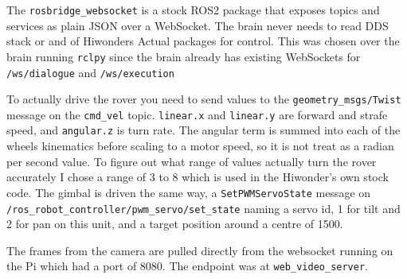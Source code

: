 \label{sec:hw_bridge}


The \texttt{rosbridge\_websocket} is a stock ROS2 package that exposes topics
and services as plain JSON over a WebSocket. The brain never needs to read DDS stack or
and of Hiwonders Actual packages for control. This was chosen over the brain running \texttt{rclpy}
since the brain already has existing WebSockets for \texttt{/ws/dialogue} and \texttt{/ws/execution}

To actually drive the rover you need to send values to the \texttt{geometry\_msgs/Twist} message on the
\texttt{cmd\_vel} topic. \texttt{linear.x} and \texttt{linear.y} are
forward and strafe speed, and \texttt{angular.z} is turn rate. The angular term is summed into each of the
wheels kinematics before scaling to a motor speed, so it is not treat as a radian per second value. To figure out
what range of values actually turn the rover accurately I chose a range of 3 to 8 which is used in the Hiwonder's
own stock code. The gimbal is driven the same way, a
\texttt{SetPWMServoState} message on
\texttt{/ros\_robot\_controller/pwm\_servo/set\_state} naming a servo id,
1 for tilt and 2 for pan on this unit, and a target position around a
centre of 1500.

The frames from the camera are pulled directly from the websocket running on the Pi which had a port of 8080. The
endpoint was at \texttt{web\_video\_server}.


\label{sec:hw_lf}
